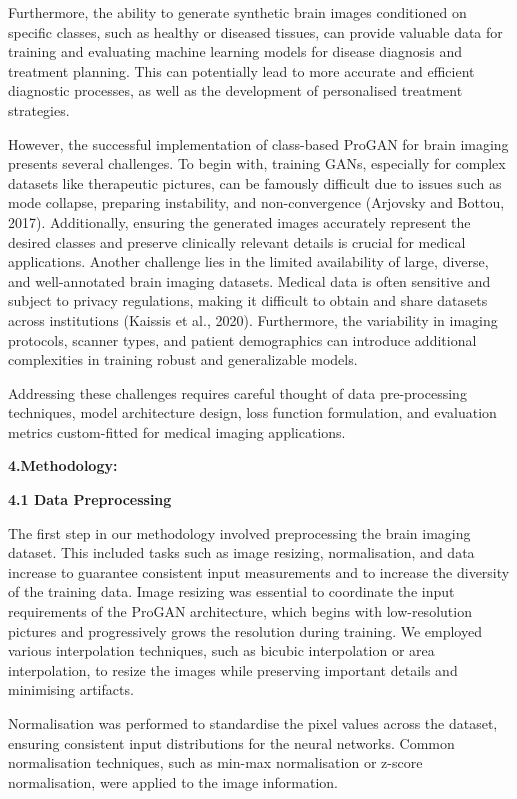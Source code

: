 \documentclass[
]{article}
\begin{document}
Furthermore, the ability to generate synthetic brain images conditioned
on specific classes, such as healthy or diseased tissues, can provide
valuable data for training and evaluating machine learning models for
disease diagnosis and treatment planning. This can potentially lead to
more accurate and efficient diagnostic processes, as well as the
development of personalised treatment strategies.

However, the successful implementation of class-based ProGAN for brain
imaging presents several challenges. To begin with, training GANs,
especially for complex datasets like therapeutic pictures, can be
famously difficult due to issues such as mode collapse, preparing
instability, and non-convergence (Arjovsky and Bottou, 2017).
Additionally, ensuring the generated images accurately represent the
desired classes and preserve clinically relevant details is crucial for
medical applications. Another challenge lies in the limited availability
of large, diverse, and well-annotated brain imaging datasets. Medical
data is often sensitive and subject to privacy regulations, making it
difficult to obtain and share datasets across institutions (Kaissis et
al., 2020). Furthermore, the variability in imaging protocols, scanner
types, and patient demographics can introduce additional complexities in
training robust and generalizable models.

Addressing these challenges requires careful thought of data
pre-processing techniques, model architecture design, loss function
formulation, and evaluation metrics custom-fitted for medical imaging
applications.

\textbf{4.Methodology:}

\textbf{4.1 Data Preprocessing}

The first step in our methodology involved preprocessing the brain
imaging dataset. This included tasks such as image resizing,
normalisation, and data increase to guarantee consistent input
measurements and to increase the diversity of the training data. Image
resizing was essential to coordinate the input requirements of the
ProGAN architecture, which begins with low-resolution pictures and
progressively grows the resolution during training. We employed various
interpolation techniques, such as bicubic interpolation or area
interpolation, to resize the images while preserving important details
and minimising artifacts.

Normalisation was performed to standardise the pixel values across the
dataset, ensuring consistent input distributions for the neural
networks. Common normalisation techniques, such as min-max normalisation
or z-score normalisation, were applied to the image information.
\end{document}
